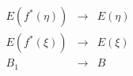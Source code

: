 $$\begin{array}{ccc}
E(f^*(\eta)) & \rightarrow & E(\eta) \\
E(f^*(\xi)) & \rightarrow & E(\xi) \\
B_1 & \rightarrow & B
\end{array}$$
